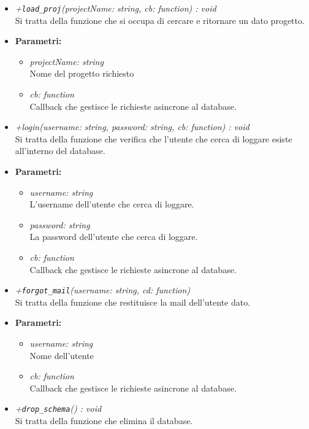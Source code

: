 \begin{itemize}
\begin{itemize}
            \item \emph{+\texttt{load\_proj}(projectName: string, cb: function) : void }\\
            Si tratta della funzione che si occupa di cercare e ritornare un dato progetto.\\
            \item \textbf{Parametri: }\\
            \begin{itemize}
              \item \emph{projectName: string}\\
              Nome del progetto richiesto
              \item \emph{cb: function}\\
              Callback che gestisce le richieste asincrone al database.
            \end{itemize}
            \item \emph{+login(username: string, password: string, cb: function) : void}\\
            Si tratta della funzione che verifica che l'utente che cerca di loggare esiste all'interno del database.\\
            \item \textbf{Parametri: }\\
            \begin{itemize}
              \item \emph{username: string}\\
              L'username dell'utente che cerca di loggare.
              \item \emph{password: string}\\
              La password dell'utente che cerca di loggare.
              \item \emph{cb: function}\\
              Callback che gestisce le richieste asincrone al database.
            \end{itemize}
            \item \emph{+\texttt{forgot\_mail}(username: string, cd: function)}\\
            Si tratta della funzione che restituisce la mail dell'utente dato.\\
            \item \textbf{Parametri: }\\
            \begin{itemize}
              \item \emph{username: string}\\
              Nome dell'utente
              \item \emph{cb: function}\\
              Callback che gestisce le richieste asincrone al database.
            \end{itemize}
            \item \emph{+\texttt{drop\_schema}() : void}\\
            Si tratta della funzione che elimina il database.
          \end{itemize}
        \end{itemize}
